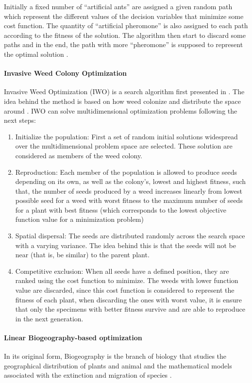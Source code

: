 Initially a fixed number of ``artificial ants'' are assigned a given random path which represent the different values of the decision variables that minimize some cost function. The quantity of ``artificial pheromone'' is also assigned to each path according to the fitness of the solution. The algorithm then start to discard some paths and in the end, the path with more ``pheromone'' is supposed to represent the optimal solution \citep{Goss1989}.
%
\paragraph{Invasive Weed Colony Optimization}
\label{sec:IWO}
%
Invasive Weed Optimization (IWO) is a search algorithm first presented in \citet{Mehrabian2006a}. The idea behind the method is based on how weed colonize and distribute the space around \citep{Binitha2012}. IWO can solve multidimensional optimization problems following the next steps:
%
\begin{enumerate}
	\item Initialize the population: First a set of random initial solutions widespread over the multidimensional problem space are selected. These solution are considered as members of the weed colony. %
	\item Reproduction: Each member of the population is allowed to produce seeds depending on its own, as well as the colony's, lowest and highest fitness, such that, the number of seeds produced by a weed increases linearly from lowest possible seed for a weed with worst fitness to the maximum number of seeds for a plant with best fitness (which corresponds to the lowest objective function value for a minimization problem)\citep{Kundu2011}%
	\item Spatial dispersal: The seeds are distributed randomly across the search space with a varying variance. The idea behind this is that the seeds will not be near (that is, be similar) to the parent plant.
	\item Competitive exclusion: When all seeds have a defined position, they are ranked using the cost function to minimize. The weeds with lower function value are discarded, since this cost function is considered to represent the fitness of each plant, when discarding the ones with worst value, it is ensure that only the specimens with better fitness survive and are able to reproduce in the next generation.
\end{enumerate}
%
\paragraph{Linear Biogeography-based optimization}
In its original form, Biogeography is the branch of biology that studies the geographical distribution of plants and animal and the mathematical models associated with the extinction and migration of species \citep{MacArthur1967}.

